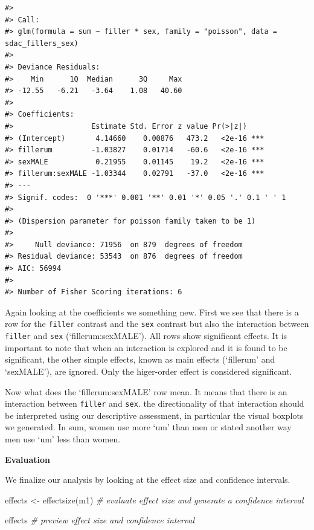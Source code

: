 \documentclass[
  letterpaper,
]{latex/krantz}
\newenvironment{Shaded}{\begin{snugshade}}{\end{snugshade}}
\newcommand{\CommentTok}[1]{\textcolor[rgb]{0.00,0.00,0.00}{\textit{#1}}}
\newcommand{\FunctionTok}[1]{\textcolor[rgb]{0.00,0.00,0.00}{#1}}
\newcommand{\NormalTok}[1]{\textcolor[rgb]{0.00,0.00,0.00}{#1}}
\newcommand{\OtherTok}[1]{\textcolor[rgb]{0.00,0.00,0.00}{#1}}
\begin{document}
\begin{verbatim}
#> 
#> Call:
#> glm(formula = sum ~ filler * sex, family = "poisson", data = sdac_fillers_sex)
#> 
#> Deviance Residuals: 
#>    Min      1Q  Median      3Q     Max  
#> -12.55   -6.21   -3.64    1.08   40.60  
#> 
#> Coefficients:
#>                  Estimate Std. Error z value Pr(>|z|)    
#> (Intercept)       4.14660    0.00876   473.2   <2e-16 ***
#> fillerum         -1.03827    0.01714   -60.6   <2e-16 ***
#> sexMALE           0.21955    0.01145    19.2   <2e-16 ***
#> fillerum:sexMALE -1.03344    0.02791   -37.0   <2e-16 ***
#> ---
#> Signif. codes:  0 '***' 0.001 '**' 0.01 '*' 0.05 '.' 0.1 ' ' 1
#> 
#> (Dispersion parameter for poisson family taken to be 1)
#> 
#>     Null deviance: 71956  on 879  degrees of freedom
#> Residual deviance: 53543  on 876  degrees of freedom
#> AIC: 56994
#> 
#> Number of Fisher Scoring iterations: 6
\end{verbatim}

Again looking at the coefficients we something new. First we see that
there is a row for the \texttt{filler} contrast and the \texttt{sex}
contrast but also the interaction between \texttt{filler} and
\texttt{sex} (`fillerum:sexMALE'). All rows show significant effects. It
is important to note that when an interaction is explored and it is
found to be significant, the other simple effects, known as main effects
(`fillerum' and `sexMALE'), are ignored. Only the higer-order effect is
considered significant.

Now what does the `fillerum:sexMALE' row mean. It means that there is an
interaction between \texttt{filler} and \texttt{sex}. the directionality
of that interaction should be interpreted using our descriptive
assessment, in particular the visual boxplots we generated. In sum,
women use more `um' than men or stated another way men use `um' less
than women.

\textbf{Evaluation}

We finalize our analysis by looking at the effect size and confidence
intervals.

\begin{Shaded}
\begin{Highlighting}[]
\NormalTok{effects }\OtherTok{\textless{}{-}} \FunctionTok{effectsize}\NormalTok{(m1) }\CommentTok{\# evaluate effect size and generate a confidence interval}

\NormalTok{effects }\CommentTok{\# preview effect size and confidence interval}
\end{Highlighting}
\end{Shaded}
\end{document}
